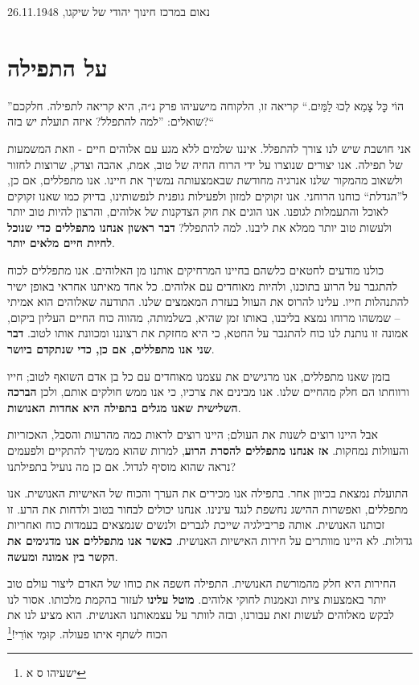 \documentclass[14pt, article, extrafontsizes, twopage, a4paper]{memoir}
\newcommand{\attr}[1]{
{\raggedright\smaller#1}
}
\begin{document}
\attr{נאום במרכז חינוך יהודי של שיקגו, 26.11.1948}

\chapter{על התפילה}

”הוֹי כׇּל צָמֵא לְכוּ לַמַּיִם.“
קריאה זו, הלקוחה מישעיהו פרק נ״ה, היא קריאה לתפילה. חלקכם שואלים: ”למה להתפלל? איזה תועלת יש בזה?“

אני חושבת שיש לנו צורך להתפלל. איננו שלמים ללא מגע עם אלוהים חיים - וזאת המשמעות של תפילה. אנו יצורים שנוצרו על ידי הרוח החיה של טוב, אמת, אהבה וצדק, שרוצות לחזור ולשאוב מהמקור שלנו אנרגיה מחודשת שבאמצעותה נמשיך את חיינו. אנו מתפללים, אם כן, ל”הגדלת“ כוחנו הרוחני. אנו זקוקים למזון ולפעילות גופנית לנפשותינו, בדיוק כמו שאנו זקוקים לאוכל והתעמלות לגופנו. אנו הוגים את חוק הצדקנות של אלוהים, והרצון להיות טוב יותר ולעשות טוב יותר ממלא את ליבנו. למה להתפלל? \textbf{דבר ראשון אנחנו מתפללים כדי שנוכל לחיות חיים מלאים יותר}.

כולנו מודעים לחטאים כלשהם בחיינו המרחיקים אותנו מן האלוהים. אנו מתפללים לכוח להתגבר על הרוע בתוכנו, ולהיות מאוחדים עם אלוהים. כל אחד מאיתנו אחראי באופן ישיר להתנהלות חייו. עלינו להרוס את העוול בעזרת המאמצים שלנו. התודעה שאלוהים הוא אמיתי -- שמשהו מרוחו נמצא בליבנו, באותו זמן שהיא, בשלמותה, מהווה כוח החיים העליון ביקום, אמונה זו נותנת לנו כוח להתגבר על החטא, כי היא מחזקת את רצוננו ומכוונת אותו לטוב. \textbf{דבר שני אנו מתפללים, אם כן, כדי שנתקדם ביושר}.

בזמן שאנו מתפללים, אנו מרגישים את עצמנו מאוחדים עם כל בן אדם השואף לטוב; חייו ורווחתו הם חלק מהחיים שלנו. אנו מבינים את צרכיו, כי אנו ממש חולקים אותם, ולכן \textbf{הברכה השלישית שאנו מגלים בתפילה היא אחדות האנושות}.

אבל היינו רוצים לשנות את העולם; היינו רוצים לראות כמה מהרעות והסבל, האכזריות והעוולות נמחקות. \textbf{אז אנחנו מתפללים להסרת הרוע}, למרות שהוא ממשיך להתקיים ולפעמים נראה שהוא מוסיף לגדול. אם כן מה נועיל בתפילתנו?

התועלת נמצאת בכיוון אחר. בתפילה אנו מכירים את הערך והכוח של האישיות האנושית. אנו מתפללים, ואפשרות ההישג נחשפת לנגד עינינו. אנחנו יכולים לבחור בטוב ולדחות את הרע. זו זכותנו האנושית. אותה פריבילגיה שייכת לגברים ולנשים שנמצאים בעמדות כוח ואחריות גדולות. לא היינו מוותרים על חירות האישיות האנושית. \textbf{כאשר אנו מתפללים אנו מדגימים את הקשר בין אמונה ומעשה}.

החירות היא חלק מהמורשת האנושית. התפילה חשפה את כוחו של האדם ליצור עולם טוב יותר באמצעות ציות ונאמנות לחוקי אלוהים. \textbf{מוטל עלינו} לעזור בהקמת מלכותו. אסור לנו לבקש מאלוהים לעשות זאת עבורנו, ובזה לוותר על עצמאותנו האנושית. הוא מציע לנו את הכוח לשתף איתו פעולה. קוּמִי אוֹרִי!\footnote{ישעיהו ס א}
\end{document}
